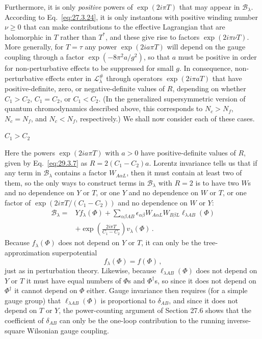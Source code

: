 Furthermore, it is only \emph{positive} powers of \(\exp(2i\pi T)\) that
may appear in \(\mathcal{B}_\lambda\). According to
Eq.~\eqref{eq:27.3.24}, it is only instantons with positive winding number
\(\nu\geq0\) that can make contributions to the effective Lagrangian that
are holomorphic in \(T\) rather than \(T^*\), and these give rise to
factors \(\exp(2i\pi\nu T)\). More generally, for \(T=\tau\) any power
\(\exp(2ia\pi T)\) will depend on the gauge coupling through a factor
\(\exp(-8\pi^2a/g^2)\), so that \(a\) must be positive in order for
non-perturbative effects to be suppressed for small \(g\). In consequence,
non-perturbative effects enter in \(\mathcal{L}^{\#}_\lambda\) through
operators \(\exp(2i\pi aT)\) that have positive-definite, zero, or
negative-definite values of \(R\), depending on whether \(C_1>C_2\),
\(C_1=C_2\), or \(C_1<C_2\). (In the generalized supersymmetric version
of quantum chromodynamics described above, this corresponds to \(N_c>N_f\),
\(N_c=N_f\), and \(N_c<N_f\), respectively.) We shall now consider each
of these cases.

\begin{center}
  \(C_1>C_2\)
\end{center}

Here the powers \(\exp(2ia\pi T)\) with \(a>0\) have positive-definite
values of \(R\), given by Eq.~\eqref{eq:29.3.7} as
\(R=2(C_1-C_2)a\). Lorentz invariance tells us that if any term in
\(\mathcal{B}_\lambda\) contains a factor \(W_{A\alpha L}\), then it must
contain at least two of them, so the only ways to construct terms in
\(\mathcal{B}_\lambda\) with \(R=2\) is to have two \(W\)s and no
dependence on \(Y\) or \(T\), or one \(Y\) and no dependence on \(W\) or
\(T\), or one factor of \(\exp(2i\pi T/(C_1-C_2))\) and no dependence
on \(W\) or \(Y\):
\begin{equation}
  \begin{aligned}
  \mathcal{B}_\lambda
  ={}&
  Yf_\lambda(\Phi)
  +\sum_{\alpha\beta AB}
  \epsilon_{\alpha\beta}W_{A\alpha L}W_{B\beta L}
  \ell_{\lambda AB}(\Phi)
  \\
  &+\exp\left(\frac{2i\pi T}{C_1-C_2}\right)v_\lambda(\Phi)\,.
  \end{aligned}
  \tag{29.3.9}\label{eq:29.3.9}
\end{equation}
Because \(f_\lambda(\Phi)\) does not depend on \(Y\) or \(T\), it can only
be the tree-approximation superpotential
\begin{equation}
  f_\lambda(\Phi)=f(\Phi)\,,
  \tag{29.3.10}\label{eq:29.3.10}
\end{equation}
just as in perturbation theory. Likewise, because
\(\ell_{\lambda AB}(\Phi)\) does not depend on \(Y\) or \(T\) it must
have equal numbers of \(\Phi\)s and \(\Phi^\dagger\)s, so since it does
not depend on \(\Phi^\dagger\) it cannot depend on \(\Phi\) either. Gauge
invariance then requires (for a simple gauge group) that
\(\ell_{\lambda AB}(\Phi)\) is proportional to \(\delta_{AB}\), and since
it does not depend on \(T\) or \(Y\), the power-counting argument of
Section 27.6 shows that the coefficient of \(\delta_{AB}\) can only be the
one-loop contribution to the running inverse-square Wilsonian gauge
coupling.

